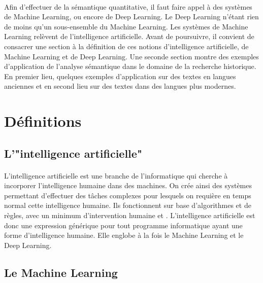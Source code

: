 \documentclass{article}
\begin{document}
\paragraph{}
Afin d’effectuer de la sémantique quantitative, il faut faire appel à des systèmes de Machine Learning, ou encore de Deep Learning. Le Deep Learning n'étant rien de moins qu’un sous-ensemble du Machine Learning. Les systèmes de Machine Learning relèvent de l’intelligence artificielle. Avant de poursuivre, il convient de consacrer une section à la définition de ces notions d’intelligence artificielle, de Machine Learning et de Deep Learning. Une seconde section montre des exemples d’application de l’analyse sémantique dans le domaine de la recherche historique. En premier lieu, quelques exemples d’application sur des textes en langues anciennes et en second lieu sur des textes dans des langues plus modernes. 
\section{Définitions}
\subsection{L'"intelligence artificielle"}
\paragraph{}
L’intelligence artificielle est une branche de l’informatique qui cherche à incorporer l’intelligence humaine dans des machines. On crée ainsi des systèmes permettant d’effectuer des tâches complexes pour lesquels on requière en temps normal cette intelligence humaine. Ils fonctionnent sur base d’algorithmes et de règles, avec un minimum d’intervention humaine \cite[p. 686]{janiesch2021machine} et \cite[pp. 131-132]{jakhar2020artificial}. L’intelligence artificielle est donc une expression générique pour tout programme informatique ayant une forme d’intelligence humaine. Elle englobe à la fois le Machine Learning et le Deep Learning\cite[p. 132]{jakhar2020artificial}. 
\subsection{Le Machine Learning}
\end{document}

